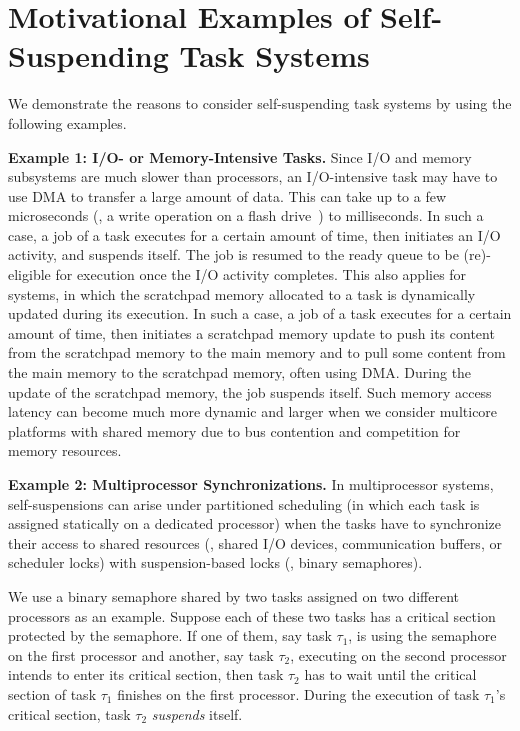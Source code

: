 \section{Motivational Examples of Self-Suspending Task Systems}
\label{sec:examples}

We demonstrate the reasons to consider self-suspending task systems by using the following examples.

{\bf Example 1: I/O- or Memory-Intensive Tasks.} Since I/O and memory subsystems are much slower than processors, an I/O-intensive task may have to use DMA to transfer a large amount of data. This can take up to a few microseconds (\eg, a write operation on a flash drive~\cite{Kang:rtss07}) to milliseconds. In such a case, a job of a task executes for a certain amount of time, then initiates an I/O activity, and suspends itself. The job is resumed to the ready queue to be (re)-eligible for execution once the I/O activity completes. This also applies for systems, in which the scratchpad memory allocated to a task is dynamically updated during its execution. In such a case, a job of a task executes for a certain amount of time, then initiates a scratchpad memory update to push its content from the scratchpad memory to the main memory and to pull some content from the main memory to the scratchpad memory, often using DMA. During the update of the scratchpad memory, the job suspends itself. Such memory access latency can become much more dynamic and larger when we consider multicore platforms with shared memory due to bus contention and competition for memory resources.

{\bf Example 2: Multiprocessor Synchronizations.} \hspace{0.1in}
In multiprocessor systems, self-suspensions can arise under partitioned scheduling (in which each task is assigned statically on a dedicated processor) when the tasks have to synchronize their access to shared resources (\eg, shared I/O devices, communication buffers, or scheduler locks) with suspension-based locks (\eg, binary semaphores). 

We use a binary semaphore shared by two tasks assigned on two different processors as an example. Suppose each of these two tasks has a critical section protected by the semaphore. If one of them, say task $\tau_1$, is using the semaphore on the first processor and another, say task $\tau_2$, executing on the second processor intends to enter its critical section, then task $\tau_2$ has to wait until the critical section of task $\tau_1$ finishes on the first processor. During the execution of task $\tau_1$'s critical section, task $\tau_2$ \emph{suspends} itself. 

